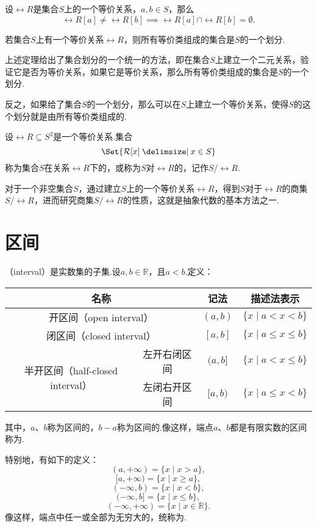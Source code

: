 \begin{lemma}
设\(\rel{R}\)是集合\(S\)上的一个等价关系，\(a,b \in S\)，那么\[
\rel{R}[a] \neq \rel{R}[b] \implies \rel{R}[a] \cap \rel{R}[b] = \emptyset.
\]
\end{lemma}

\begin{theorem}
若集合\(S\)上有一个等价关系\(\rel{R}\)，则所有等价类组成的集合是\(S\)的一个划分.
\end{theorem}
上述定理给出了集合划分的一个统一的方法，即在集合\(S\)上建立一个二元关系，验证它是否为等价关系，如果它是等价关系，那么所有等价类组成的集合是\(S\)的一个划分.

反之，如果给了集合\(S\)的一个划分，那么可以在\(S\)上建立一个等价关系，使得\(S\)的这个划分就是由所有等价类组成的.

\begin{definition}
设\(\rel{R} \subseteq S^2\)是一个等价关系.集合\[
\Set{\rel{R}[x] \given x \in S}
\]称为集合\(S\)在关系\(\rel{R}\)下的，或称为\(S\)对\(\rel{R}\)的，记作\(S/\rel{R}\).
\end{definition}
对于一个非空集合\(S\)，通过建立\(S\)上的一个等价关系\(\rel{R}\)，得到\(S\)对于\(\rel{R}\)的商集\(S/\rel{R}\)，进而研究商集\(S/\rel{R}\)的性质，这就是抽象代数的基本方法之一.

\section{区间}
\begin{definition}
（interval）是实数集的子集.设\(a,b\in\mathbb{R}\)，且\(a<b\).定义：
\begin{center}
\begin{tabular}{|c|c|c|c|} \hline
\multicolumn{2}{|c|}{名称} & 记法 & 描述法表示 \\ \hline
\multicolumn{2}{|c|}{开区间（open interval）} & \((a,b)\) & \(\{ x \mid a < x < b \}\) \\ \hline
\multicolumn{2}{|c|}{闭区间（closed interval）} & \([a,b]\) & \(\{ x \mid a \leqslant x \leqslant b \}\) \\ \hline
\multirow{2}{*}{半开区间（half-closed interval）} & 左开右闭区间 & \((a,b]\) & \(\{ x \mid a < x \leqslant b \}\) \\ \cline{2-4}
& 左闭右开区间 & \([a,b)\) & \(\{ x \mid a \leqslant x < b \}\) \\ \hline
\end{tabular}
\end{center}
其中，\(a\)、\(b\)称为区间的，\(b-a\)称为区间的.像这样，端点\(a\)、\(b\)都是有限实数的区间称为.

特别地，有如下的定义：
\[ (a,+\infty) = \{ x \mid x > a\}, \]
\[ [a,+\infty) = \{ x \mid x \geqslant a\}, \]
\[ (-\infty,b) = \{ x \mid x < b\}, \]
\[ (-\infty,b] = \{ x \mid x \leqslant b\}, \]
\[ (-\infty,+\infty) = \{ x \mid x \in \mathbb{R} \}. \]
像这样，端点中任一或全部为无穷大的，统称为.
\end{definition}

